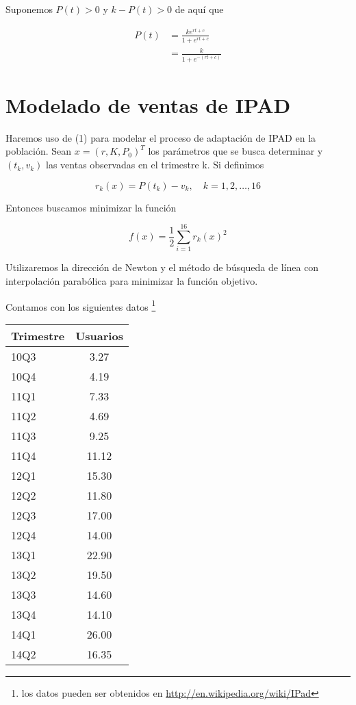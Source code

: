 \documentclass[11pt]{article}
\begin{document}
Suponemos $P(t) > 0$ y $k -P(t) >0$ de aquí que

\begin{equation*}
\begin{split}
P(t) & = \frac{ke^{rt + c}}{1+e^{rt + c}}\\
     & = \frac{k}{1+e^{-(rt + c)}}
\end{split}
\end{equation*}


\section{Modelado de ventas de IPAD}

Haremos uso de (1) para modelar el proceso de adaptación de IPAD en la población. Sean $x = (r, K, P_0)^T$ los parámetros que se busca determinar y $(t_k, v_k)$ las ventas observadas en el trimestre k. Si definimos
\begin{centering}
\begin{equation}
r_k(x) = P(t_k) - v_k,\quad k = 1, 2, \dots, 16
\end{equation}
\end{centering}

Entonces buscamos minimizar la función

\begin{centering}
\begin{equation}
f(x) = \frac{1}{2}\displaystyle\sum_{i = 1}^{16}r_k(x)^2
\end{equation}
\end{centering}

Utilizaremos la dirección de Newton y el método de búsqueda de línea con interpolación parabólica para minimizar la función objetivo.

Contamos con los siguientes datos \footnote{
los datos pueden ser obtenidos en \url{http://en.wikipedia.org/wiki/IPad}}

\begin{center}
\begin{tabular}{| l | c |}\hline
Trimestre & Usuarios\\\hline
10Q3 & 3.27  \\
10Q4 & 4.19  \\
11Q1 & 7.33  \\
11Q2 & 4.69  \\
11Q3 & 9.25  \\
11Q4 & 11.12 \\
12Q1 & 15.30 \\
12Q2 & 11.80 \\
12Q3 & 17.00 \\
12Q4 & 14.00 \\
13Q1 & 22.90 \\
13Q2 & 19.50 \\
13Q3 & 14.60 \\
13Q4 & 14.10 \\
14Q1 & 26.00 \\
14Q2 & 16.35 \\\hline
\end{tabular}
\end{center}
\end{document}
